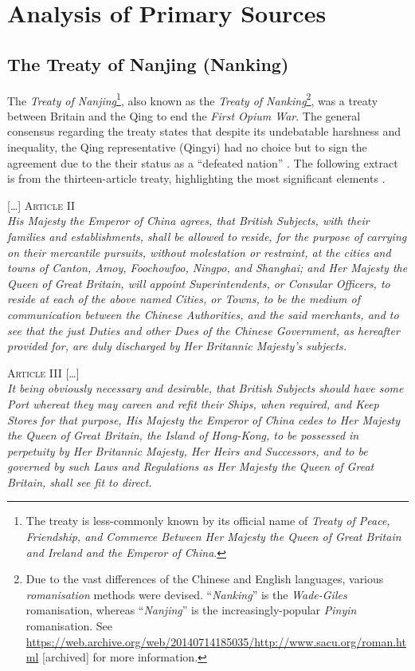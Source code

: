 \documentclass{article}
\newcommand{\textrule}{\noindent\makebox[\linewidth]{\rule{\linewidth}{0.4pt}}}
\begin{document}
\section{Analysis of Primary Sources}

\subsection{The Treaty of Nanjing (Nanking)}

The \textit{Treaty of Nanjing}\footnote{The treaty is less-commonly known by its official name of \textit{Treaty of Peace, Friendship, and Commerce Between Her Majesty the Queen of Great Britain and Ireland and the Emperor of China}.}, also known as the \textit{Treaty of Nanking}\footnote{Due to the vast differences of the Chinese and English languages, various \textit{romanisation} methods were devised. ``\textit{Nanking}'' is the \textit{Wade-Giles} romanisation, whereas ``\textit{Nanjing}'' is the increasingly-popular \textit{Pinyin} romanisation. See \url{https://web.archive.org/web/20140714185035/http://www.sacu.org/roman.html} [archived] for more information.}, was a treaty between Britain and the Qing to end the \textit{First Opium War}. The general consensus regarding the treaty states that despite its undebatable harshness and inequality, the Qing representative (Qingyi) had no choice but to sign the agreement due to the their status as a ``defeated nation''
\autocite{Mao:2018}. The following extract is from the thirteen-article treaty, highlighting the most significant elements
\autocite{Mayers:1902}.

\textrule
\vspace{0.6em}
{\centering \textsc{[\ldots] Article II} \\[1em]}
\textit{His Majesty the Emperor of China agrees, that British Subjects, with their families and establishments, shall be allowed to reside, for the purpose of carrying on their mercantile pursuits, without molestation or restraint, at the cities and towns of Canton, Amoy, Foochowfoo, Ningpo, and Shanghai; and Her Majesty the Queen of Great Britain, will appoint Superintendents, or Consular Officers, to reside at each of the above named Cities, or Towns, to be the medium of communication between the Chinese Authorities, and the said merchants, and to see that the just Duties and other Dues of the Chinese Government, as hereafter provided for, are duly discharged by Her Britannic Majesty's subjects.}

{\centering \textsc{Article III [\ldots]} \\[1em]}
\textit{It being obviously necessary and desirable, that British Subjects should have some Port whereat they may careen and refit their Ships, when required, and Keep Stores for that purpose, His Majesty the Emperor of China cedes to Her Majesty the Queen of Great Britain, the Island of Hong-Kong, to be possessed in perpetuity by Her Britannic Majesty, Her Heirs and Successors, and to be governed by such Laws and Regulations as Her Majesty the Queen of Great Britain, shall see fit to direct.} \\
\end{document}
